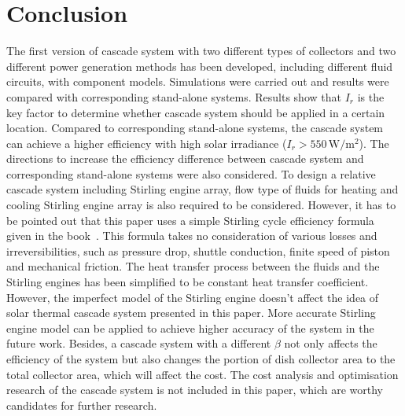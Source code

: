 \section{Conclusion}

The first version of cascade system with two different types of collectors and two different power generation methods has been developed, including different fluid circuits, with component models. Simulations were carried out and results were compared with corresponding stand-alone systems. Results show that $I_r$ is the key factor to determine whether cascade system should be applied in a certain location. Compared to corresponding stand-alone systems, the cascade system can achieve a higher efficiency with high solar irradiance ($I_r > 550\,\mathrm{W/m^2}$). The directions to increase the efficiency difference between cascade system and corresponding stand-alone systems were also considered. To design a relative cascade system including Stirling engine array, flow type of fluids for heating and cooling Stirling engine array is also required to be considered. However, it has to be pointed out that this paper uses a simple Stirling cycle efficiency formula given in the book~\cite{Stine1985}. This formula takes no consideration of various losses and irreversibilities, such as pressure drop, shuttle conduction, finite speed of piston and mechanical friction. The heat transfer process between the fluids and the Stirling engines has been simplified to be constant heat transfer coefficient. However, the imperfect model of the Stirling engine doesn't affect the idea of solar thermal cascade system presented in this paper. More accurate Stirling engine model can be applied to achieve higher accuracy of the system in the future work. Besides, a cascade system with a different $\beta$ not only affects the efficiency of the system but also changes the portion of dish collector area to the total collector area, which will affect the cost. The cost analysis and optimisation research of the cascade system is not included in this paper, which are worthy candidates for further research.